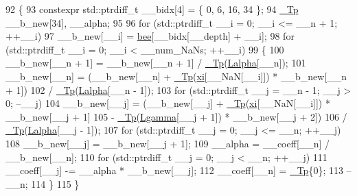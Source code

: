 \begin{DoxyCode}
92     \{
93       constexpr std::ptrdiff\_t \_\_bidx[4] = \{ 0, 6, 16, 34 \};
94       \hyperlink{namespace____gnu__cxx_a3b19a9c800ca194374ef9172290f7d79}{\_Tp} \_\_b\_new[34], \_\_alpha;
95 
96       \textcolor{keywordflow}{for} (std::ptrdiff\_t \_\_i = 0; \_\_i <= \_\_n + 1; ++\_\_i)
97         \_\_b\_new[\_\_i] = \hyperlink{namespace____gnu__cxx_aad4f17907300687377704d1e628e1d70}{bee}[\_\_bidx[\_\_depth] + \_\_i];
98       \textcolor{keywordflow}{for} (std::ptrdiff\_t \_\_i = 0; \_\_i < \_\_num\_NaNs; ++\_\_i)
99         \{
100           \_\_b\_new[\_\_n + 1] = \_\_b\_new[\_\_n + 1] / \hyperlink{namespace____gnu__cxx_a3b19a9c800ca194374ef9172290f7d79}{\_Tp}(\hyperlink{namespace____gnu__cxx_a6a28a325aceb8d1e4e70d68b1cdeb156}{Lalpha}[\_\_n]);
101           \_\_b\_new[\_\_n] = (\_\_b\_new[\_\_n] + \hyperlink{namespace____gnu__cxx_a3b19a9c800ca194374ef9172290f7d79}{\_Tp}(\hyperlink{namespace____gnu__cxx_a8a912ee89c90a7e5049ce5ffad04274b}{xi}[\_\_NaN[\_\_i]]) * \_\_b\_new[\_\_n + 1])
102                        / \hyperlink{namespace____gnu__cxx_a3b19a9c800ca194374ef9172290f7d79}{\_Tp}(\hyperlink{namespace____gnu__cxx_a6a28a325aceb8d1e4e70d68b1cdeb156}{Lalpha}[\_\_n - 1]);
103           \textcolor{keywordflow}{for} (std::ptrdiff\_t \_\_j = \_\_n - 1; \_\_j > 0; --\_\_j)
104             \_\_b\_new[\_\_j] = (\_\_b\_new[\_\_j] + \hyperlink{namespace____gnu__cxx_a3b19a9c800ca194374ef9172290f7d79}{\_Tp}(\hyperlink{namespace____gnu__cxx_a8a912ee89c90a7e5049ce5ffad04274b}{xi}[\_\_NaN[\_\_i]]) * \_\_b\_new[\_\_j + 1]
105                            - \hyperlink{namespace____gnu__cxx_a3b19a9c800ca194374ef9172290f7d79}{\_Tp}(\hyperlink{namespace____gnu__cxx_a8148a5d125951ff217becb9212005bea}{Lgamma}[\_\_j + 1]) * \_\_b\_new[\_\_j + 2])
106                          / \hyperlink{namespace____gnu__cxx_a3b19a9c800ca194374ef9172290f7d79}{\_Tp}(\hyperlink{namespace____gnu__cxx_a6a28a325aceb8d1e4e70d68b1cdeb156}{Lalpha}[\_\_j - 1]);
107           \textcolor{keywordflow}{for} (std::ptrdiff\_t \_\_j = 0; \_\_j <= \_\_n; ++\_\_j)
108             \_\_b\_new[\_\_j] = \_\_b\_new[\_\_j + 1];
109           \_\_alpha = \_\_coeff[\_\_n] / \_\_b\_new[\_\_n];
110           \textcolor{keywordflow}{for} (std::ptrdiff\_t \_\_j = 0; \_\_j < \_\_n; ++\_\_j)
111             \_\_coeff[\_\_j] -= \_\_alpha * \_\_b\_new[\_\_j];
112           \_\_coeff[\_\_n] = \hyperlink{namespace____gnu__cxx_a3b19a9c800ca194374ef9172290f7d79}{\_Tp}\{0\};
113           --\_\_n;
114         \}
115     \}
\end{DoxyCode}
\mbox{\label{namespace____gnu__cxx_a64fbc0765e55d7466a21baa9f652362e}} 
